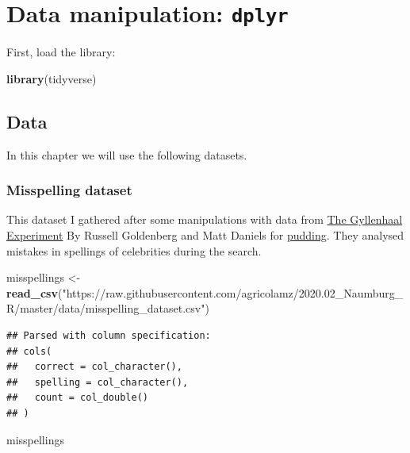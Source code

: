 \documentclass[
]{book}
\newenvironment{Shaded}{\begin{snugshade}}{\end{snugshade}}
\newcommand{\KeywordTok}[1]{\textcolor[rgb]{0.13,0.29,0.53}{\textbf{#1}}}
\newcommand{\NormalTok}[1]{#1}
\newcommand{\StringTok}[1]{\textcolor[rgb]{0.31,0.60,0.02}{#1}}
\begin{document}
\hypertarget{dplyr}{%
\chapter{\texorpdfstring{Data manipulation: \texttt{dplyr}}{Data manipulation: dplyr}}\label{dplyr}}

First, load the library:

\begin{Shaded}
\begin{Highlighting}[]
\KeywordTok{library}\NormalTok{(tidyverse)}
\end{Highlighting}
\end{Shaded}

\hypertarget{data}{%
\section{Data}\label{data}}

In this chapter we will use the following datasets.

\hypertarget{misspelling-dataset}{%
\subsection{Misspelling dataset}\label{misspelling-dataset}}

This dataset I gathered after some manipulations with data from \href{https://pudding.cool/2019/02/gyllenhaal/}{The Gyllenhaal Experiment} By Russell Goldenberg and Matt Daniels for \href{https://pudding.cool}{pudding}. They analysed mistakes in spellings of celebrities during the search.

\begin{Shaded}
\begin{Highlighting}[]
\NormalTok{misspellings <-}\StringTok{ }\KeywordTok{read_csv}\NormalTok{(}\StringTok{"https://raw.githubusercontent.com/agricolamz/2020.02_Naumburg_R/master/data/misspelling_dataset.csv"}\NormalTok{)}
\end{Highlighting}
\end{Shaded}

\begin{verbatim}
## Parsed with column specification:
## cols(
##   correct = col_character(),
##   spelling = col_character(),
##   count = col_double()
## )
\end{verbatim}

\begin{Shaded}
\begin{Highlighting}[]
\NormalTok{misspellings}
\end{Highlighting}
\end{Shaded}
\end{document}
